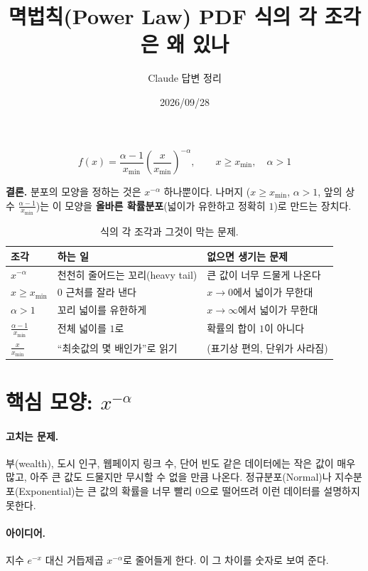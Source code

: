 \documentclass[11pt]{article}
\title{멱법칙(Power Law) PDF 식의 각 조각은 왜 있나}
\author{Claude 답변 정리}
\date{2026/09/28}
\newcommand{\term}[1]{\textbf{#1}}
\begin{document}
\maketitle

\[
  f(x) = \frac{\alpha - 1}{x_{\min}} \left(\frac{x}{x_{\min}}\right)^{-\alpha},
  \qquad x \ge x_{\min},\quad \alpha > 1
\]

\textbf{결론.} 분포의 모양을 정하는 것은 $x^{-\alpha}$ 하나뿐이다. 나머지
($x \ge x_{\min}$, $\alpha > 1$, 앞의 상수 $\frac{\alpha-1}{x_{\min}}$)는 이 모양을
\term{올바른 확률분포}(넓이가 유한하고 정확히 $1$)로 만드는 장치다.

\begin{table}[H]
  \centering
  \caption{식의 각 조각과 그것이 막는 문제.}
  \label{tab:pieces}
  \begin{tabular}{lll}
    \toprule
    조각 & 하는 일 & 없으면 생기는 문제 \\
    \midrule
    $x^{-\alpha}$ & 천천히 줄어드는 꼬리(heavy tail) & 큰 값이 너무 드물게 나온다 \\
    \midrule
    $x \ge x_{\min}$ & $0$ 근처를 잘라 낸다 & $x \to 0$에서 넓이가 무한대 \\
    \midrule
    $\alpha > 1$ & 꼬리 넓이를 유한하게 & $x \to \infty$에서 넓이가 무한대 \\
    \midrule
    $\frac{\alpha-1}{x_{\min}}$ & 전체 넓이를 $1$로 & 확률의 합이 $1$이 아니다 \\
    \midrule
    $\frac{x}{x_{\min}}$ & ``최솟값의 몇 배인가''로 읽기 & (표기상 편의, 단위가 사라짐) \\
    \bottomrule
  \end{tabular}
\end{table}

\section{핵심 모양: $x^{-\alpha}$}
\label{sec:shape}

\paragraph{고치는 문제.}
부(wealth), 도시 인구, 웹페이지 링크 수, 단어 빈도 같은 데이터에는 작은 값이 매우 많고,
아주 큰 값도 드물지만 무시할 수 없을 만큼 나온다. 정규분포(Normal)나
지수분포(Exponential)는 큰 값의 확률을 너무 빨리 $0$으로 떨어뜨려 이런 데이터를
설명하지 못한다.

\paragraph{아이디어.}
지수 $e^{-x}$ 대신 거듭제곱 $x^{-\alpha}$로 줄어들게 한다. 이 그 차이를
숫자로 보여 준다.
\end{document}
